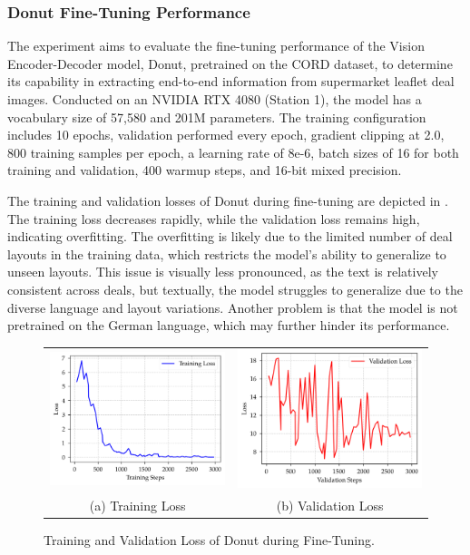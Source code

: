 \documentclass[11pt]{article}
\begin{document}
\subsubsection{Donut Fine-Tuning Performance}
The experiment aims to evaluate the fine-tuning performance of the Vision Encoder-Decoder model, Donut, pretrained on the CORD dataset, to determine its capability in extracting end-to-end information from supermarket leaflet deal images. Conducted on an NVIDIA RTX 4080 (Station 1), the model has a vocabulary size of 57,580 and 201M parameters. The training configuration includes 10 epochs, validation performed every epoch, gradient clipping at 2.0, 800 training samples per epoch, a learning rate of 8e-6, batch sizes of 16 for both training and validation, 400 warmup steps, and 16-bit mixed precision.

 The training and validation losses of Donut during fine-tuning are depicted in . The training loss decreases rapidly, while the validation loss remains high, indicating overfitting. The overfitting is likely due to the limited number of deal layouts in the training data, which restricts the model's ability to generalize to unseen layouts. This issue is visually less pronounced, as the text is relatively consistent across deals, but textually, the model struggles to generalize due to the diverse language and layout variations. Another problem is that the model is not pretrained on the German language, which may further hinder its performance.

\begin{figure}[h!]
    \begin{tabular}{cc}
    \includegraphics[width=0.4\linewidth]{figures/donut_train_loss.png} &\includegraphics[width=0.4\linewidth]{figures/donut_val_loss.png} \\
    (a) Training Loss & (b) Validation Loss \\[6pt]
    \end{tabular}
    \caption{Training and Validation Loss of Donut during Fine-Tuning.}
    \label{fig:donut_loss}
\end{figure}
\end{document}
